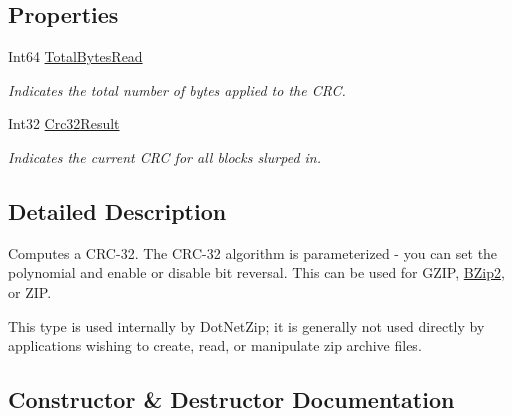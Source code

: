 \subsection*{Properties}
\begin{DoxyCompactItemize}
\item 
Int64 \mbox{\hyperlink{class_super_tiled2_unity_1_1_ionic_1_1_crc_1_1_c_r_c32_ac5179e08a9efec03818f9742d2fe3f41}{Total\+Bytes\+Read}}
\begin{DoxyCompactList}\small\item\em Indicates the total number of bytes applied to the C\+RC. \end{DoxyCompactList}\item 
Int32 \mbox{\hyperlink{class_super_tiled2_unity_1_1_ionic_1_1_crc_1_1_c_r_c32_ac401eaaaa2cbfcceabfa4f42146739e0}{Crc32\+Result}}
\begin{DoxyCompactList}\small\item\em Indicates the current C\+RC for all blocks slurped in. \end{DoxyCompactList}\end{DoxyCompactItemize}


\subsection{Detailed Description}
Computes a C\+R\+C-\/32. The C\+R\+C-\/32 algorithm is parameterized -\/ you can set the polynomial and enable or disable bit reversal. This can be used for G\+Z\+IP, \mbox{\hyperlink{namespace_super_tiled2_unity_1_1_ionic_1_1_b_zip2}{B\+Zip2}}, or Z\+IP. 

This type is used internally by Dot\+Net\+Zip; it is generally not used directly by applications wishing to create, read, or manipulate zip archive files. 

\subsection{Constructor \& Destructor Documentation}
\mbox{\label{class_super_tiled2_unity_1_1_ionic_1_1_crc_1_1_c_r_c32_aaa06a281b345284e2703ffb94ba46433}} 
